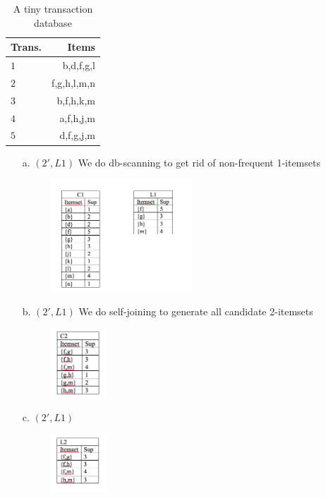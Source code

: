 \begin{table}[h!]
\begin{center}
\begin{tabular}{lr}
\toprule
Trans. &Items  \\ \hline 
$1$ &b,d,f,g,l  \\ 
$2$ &f,g,h,l,m,n  \\
$3$ &b,f,h,k,m  \\ 
$4$ &a,f,h,j,m  \\ 
$5$ &d,f,g,j,m  \\ 
\bottomrule
\end{tabular}
\caption{A tiny transaction database}
\end{center}
\end{table}

\begin{itemize}
\item[a.] $(2', L1)$ We do db-scanning to get rid of non-frequent 1-itemsets

\begin{figure}[H]
\includegraphics[width=0.5\textwidth]{Figures/C1.png}
\centering
\end{figure}

\item[b.] $(2', L1)$ We do self-joining to generate all candidate 2-itemsets

\begin{figure}[H]
\includegraphics[width=0.2\textwidth]{Figures/C2.png}
\centering
\end{figure}

\item[c.] $(2', L1)$ 

\begin{figure}[H]
\includegraphics[width=0.2\textwidth]{Figures/L2.png}
\centering
\end{figure}


\end{itemize}
